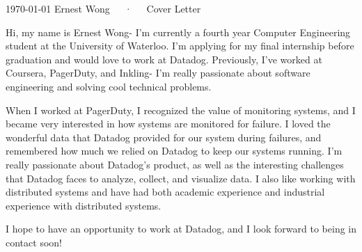 \documentclass[11pt, a4paper]{awesome-cv}
\begin{document}
\makecvheader

\makecvfooter
  {\today}
  {Ernest Wong~~~·~~~Cover Letter}
  {}

\makelettertitle

\begin{cvletter}

Hi, my name is Ernest Wong- I'm currently a fourth year Computer Engineering student at the University of Waterloo. I'm applying for my final internship before graduation and would love to work at Datadog. Previously, I've worked at Coursera, PagerDuty, and Inkling- I'm really passionate about software engineering and solving cool technical problems.

When I worked at PagerDuty, I recognized the value of monitoring systems, and I became very interested in how systems are monitored for failure. I loved the wonderful data that Datadog provided for our system during failures, and remembered how much we relied on Datadog to keep our systems running. I'm really passionate about Datadog's product, as well as the interesting challenges that Datadog faces to analyze, collect, and visualize data. I also like working with distributed systems and have had both academic experience and industrial experience with distributed systems. 

I hope to have an opportunity to work at Datadog, and I look forward to being in contact soon!

\end{cvletter}


\makeletterclosing
\end{document}
